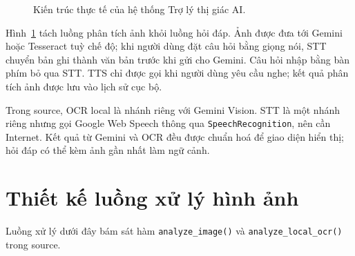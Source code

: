 \begin{figure}[H]
{
}
\caption{Kiến trúc thực tế của hệ thống Trợ lý thị giác AI.}
\label{fig:kientruc}
\end{figure}

Hình~\ref{fig:kientruc} tách luồng phân tích ảnh khỏi luồng hỏi đáp. Ảnh được
đưa tới Gemini hoặc Tesseract tuỳ chế độ; khi người dùng đặt câu hỏi bằng
giọng nói, STT chuyển bản ghi thành văn bản trước khi gửi cho Gemini. Câu hỏi
nhập bằng bàn phím bỏ qua STT. TTS chỉ được gọi khi người dùng yêu cầu nghe;
kết quả phân tích ảnh được lưu vào lịch sử cục bộ.

Trong source, OCR local là nhánh riêng với Gemini Vision. STT là một nhánh
riêng nhưng gọi Google Web Speech thông qua
\texttt{SpeechRecognition}, nên cần Internet. Kết quả từ Gemini và OCR đều được
chuẩn hoá để giao diện hiển thị; hỏi đáp có thể kèm ảnh gần nhất làm ngữ cảnh.

\section{Thiết kế luồng xử lý hình ảnh}

Luồng xử lý dưới đây bám sát hàm \texttt{analyze\_image()} và \texttt{analyze\_local\_ocr()}
trong source.

